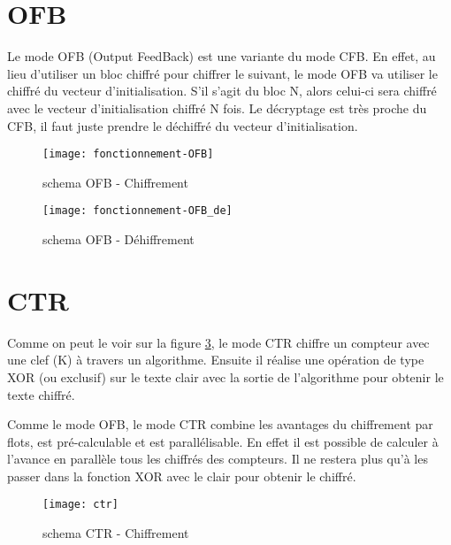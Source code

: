 \section{OFB}
Le mode OFB (Output FeedBack) est une variante du mode CFB. En effet, au lieu d'utiliser un bloc chiffré pour chiffrer le suivant, le mode OFB va utiliser le chiffré du vecteur d'initialisation. S'il s'agit du bloc N, alors celui-ci sera chiffré avec le vecteur d'initialisation chiffré N fois. Le décryptage est très proche du CFB, il faut juste prendre le déchiffré du vecteur d'initialisation.


\begin{figure}[!h]
  \centering
  \texttt{[image: fonctionnement-OFB]}
  \caption{schema OFB - Chiffrement}
  \label{schema OFB - Chiffrement}
\end{figure}

\begin{figure}[!h]
  \centering
  \texttt{[image: fonctionnement-OFB\_de]}
  \caption{schema OFB - Déhiffrement}
  \label{schema OFB - Déchiffrement}
\end{figure}

\section{CTR}
\label{ctr}

Comme on peut le voir sur la figure \ref{schema CTR - Chiffrement}, le mode CTR chiffre un compteur avec une clef (K) à travers un algorithme. Ensuite il réalise une opération de type \og XOR\fg{} (ou exclusif) sur le texte clair avec la sortie de l'algorithme pour obtenir le texte chiffré. 

Comme le mode OFB, le mode CTR combine les avantages du chiffrement par flots, est pré-calculable et est parallélisable. En effet il est possible de calculer à l'avance en parallèle tous les chiffrés des compteurs. Il ne restera plus qu'à les passer dans la fonction XOR avec le clair pour obtenir le chiffré.




\begin{figure}[!h]
  \centering
  \texttt{[image: ctr]}
  \caption{schema CTR - Chiffrement \cite{wiki}}
  \label{schema CTR - Chiffrement}
\end{figure}


